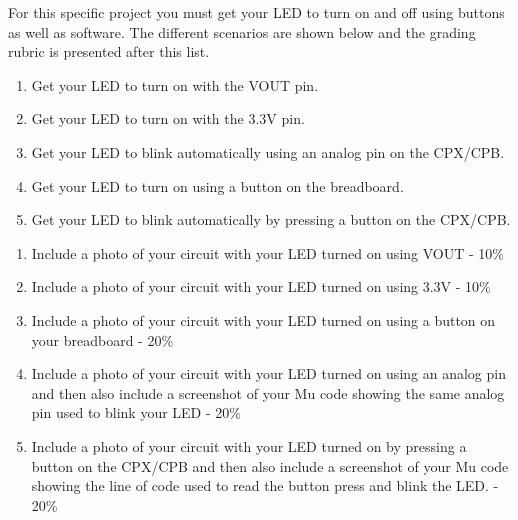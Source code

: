 For this specific project you must get your LED to turn on and off using buttons as well as software. The different scenarios are shown below and the grading rubric is presented after this list.

\begin{enumerate}[itemsep=-5pt]
\item Get your LED to turn on with the VOUT pin.
\item Get your LED to turn on with the 3.3V pin.
\item Get your LED to blink automatically using an analog pin on the CPX/CPB.
\item Get your LED to turn on using a button on the breadboard.
\item Get your LED to blink automatically by pressing a button on the CPX/CPB.
\end{enumerate}



\begin{enumerate}[itemsep=-5pt]
\item Include a photo of your circuit with your LED turned on using VOUT - 10\%
\item Include a photo of your circuit with your LED turned on using 3.3V - 10\%
\item Include a photo of your circuit with your LED turned on using a button on your breadboard - 20\%
\item Include a photo of your circuit with your LED turned on using an analog pin and then also include a screenshot of your Mu code showing the same analog pin used to blink your LED - 20\%
\item Include a photo of your circuit with your LED turned on by pressing a button on the CPX/CPB and then also include a screenshot of your Mu code showing the line of code used to read the button press and blink the LED. - 20\%
\end{enumerate}
